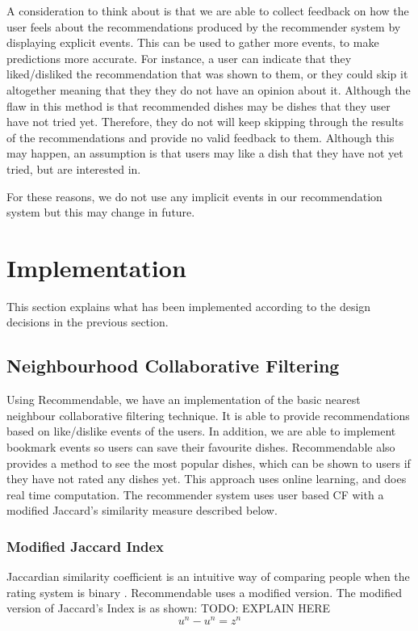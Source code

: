A consideration to think about is that we are able to collect feedback on how the user feels about the recommendations produced by the recommender system by displaying explicit events. This can be used to gather more events, to make predictions more accurate. For instance, a user can indicate that they liked/disliked the recommendation that was shown to them, or they could skip it altogether meaning that they they do not have an opinion about it. Although the flaw in this method is that recommended dishes may be dishes that they user have not tried yet. Therefore, they do not will keep skipping through the results of the recommendations and provide no valid feedback to them. Although this may happen, an assumption is that users may like a dish that they have not yet tried, but are interested in. 

For these reasons, we do not use any implicit events in our recommendation system but this may change in future. 

\section{Implementation}

This section explains what has been implemented according to the design decisions in the previous section. 

\subsection{Neighbourhood Collaborative Filtering}

Using Recommendable, we have an implementation of the basic nearest neighbour collaborative filtering technique. It is able to provide recommendations based on like/dislike events of the users. In addition, we are able to implement bookmark events so users can save their favourite dishes. Recommendable also provides a method to see the most popular dishes, which can be shown to users if they have not rated any dishes yet. This approach uses online learning, and does real time computation. The recommender system uses user based CF with a modified Jaccard's similarity measure described below.

\subsubsection{Modified Jaccard Index}

Jaccardian similarity coefficient is an intuitive way of comparing people when the rating system is binary \cite{recommendable}. Recommendable uses a modified version. The modified version of Jaccard's Index is as shown:
TODO: EXPLAIN HERE
\[ u^n - u^n = z^n \]

